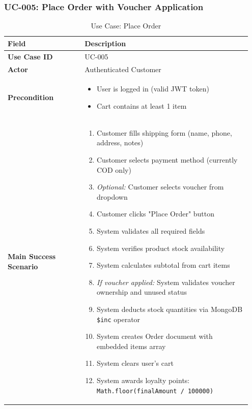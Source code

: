 \subsubsection{UC-005: Place Order with Voucher Application}

\begin{table}[H]
\centering
\caption{Use Case: Place Order}
\label{tab:uc_order}
\begin{tabular}{@{}p{0.30\linewidth}p{0.65\linewidth}@{}}
\toprule
\textbf{Field} & \textbf{Description} \\
\midrule
\textbf{Use Case ID} & UC-005 \\
\textbf{Actor} & Authenticated Customer \\
\textbf{Precondition} & 
\begin{minipage}[t]{\linewidth}
\begin{itemize}[leftmargin=*, nosep]
    \item User is logged in (valid JWT token)
    \item Cart contains at least 1 item
\end{itemize}
\end{minipage} \\
\textbf{Main Success Scenario} & 
\begin{minipage}[t]{\linewidth}
\begin{enumerate}[leftmargin=*, nosep]
    \item Customer fills shipping form (name, phone, address, notes)
    \item Customer selects payment method (currently COD only)
    \item \textit{Optional:} Customer selects voucher from dropdown
    \item Customer clicks "Place Order" button
    \item System validates all required fields
    \item System verifies product stock availability
    \item System calculates subtotal from cart items
    \item \textit{If voucher applied:} System validates voucher ownership and unused status
    \item System deducts stock quantities via MongoDB \texttt{\$inc} operator
    \item System creates Order document with embedded items array
    \item System clears user's cart
    \item System awards loyalty points: \texttt{Math.floor(finalAmount / 100000)}

\end{enumerate}
\end{minipage}
\end{tabular}
\end{table}
